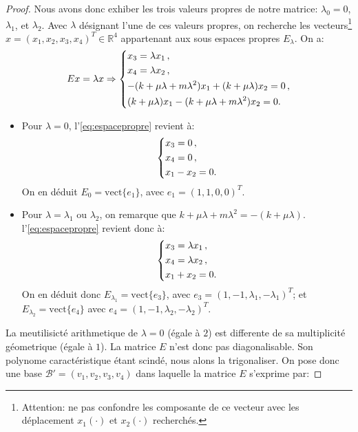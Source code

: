\begin{proof}
\noindent Nous avons donc exhiber les trois valeurs propres de notre matrice: $\lambda_0 = 0$, $\lambda_1$, et $\lambda_2$. Avec $\lambda$ désignant l'une de ces valeurs propres, on recherche les vecteurs\footnote{Attention: ne pas confondre les composante de ce vecteur avec les déplacement $x_1(\cdot)$ et $x_2(\cdot)$ recherchés.} $x = (x_1, x_2, x_3, x_4)^T \in \mathbb{R}^4$ appartenant aux sous espaces propres $E_\lambda$. On a:
\begin{align} \label{eq:espacepropre}
    Ex = \lambda x \Rightarrow \begin{dcases}
        x_3 = \lambda x_1 \,, \\
        x_4 = \lambda x_2 \,, \\
        -(k + \mu \lambda + m \lambda^2) x_1 + (k + \mu \lambda) x_2 = 0 \,, \\
        (k + \mu \lambda) x_1 - (k + \mu \lambda + m \lambda^2) x_2 = 0 .
    \end{dcases}
\end{align}
\begin{itemize}
    \item Pour $\lambda = 0$, l'\cref{eq:espacepropre} revient à:
    \begin{align*}
        \begin{dcases}            
        x_3 = 0 \,, \\
        x_4 = 0 \,, \\
        x_1 - x_2 = 0 .
        \end{dcases}
    \end{align*} 
    On en déduit $E_0 = \text{vect}\{ e_1 \}$, avec $e_1 = (1,1,0,0)^T$.
    \item Pour $\lambda = \lambda_1$ ou $\lambda_2$, on remarque que $k + \mu \lambda + m \lambda^2 = - (k + \mu \lambda)$. l'\cref{eq:espacepropre} revient donc à:
    \begin{align*}
        \begin{dcases}            
        x_3 = \lambda x_1 \,, \\
        x_4 = \lambda x_2 \,, \\
        x_1 + x_2 = 0 .
        \end{dcases}
    \end{align*} 
    On en déduit donc $E_{\lambda_1} = \text{vect}\{ e_3 \}$, avec $e_3 = (1,-1,\lambda_1,-\lambda_1)^T$; et $E_{\lambda_2} = \text{vect}\{ e_4 \}$ avec $e_4 = (1,-1,\lambda_2,-\lambda_2)^T$.
\end{itemize}
La meutilisicté arithmetique de $\lambda = 0$ (égale à $2$) est differente de sa multiplicité géometrique (égale à $1$). La matrice $E$ n'est donc pas diagonalisable. Son polynome caractéristique étant scindé, nous alons la trigonaliser. On pose donc une base $\mathcal{B}' = (v_1, v_2, v_3, v_4)$ dans laquelle la matrice $E$ s'exprime par:

\end{proof}
